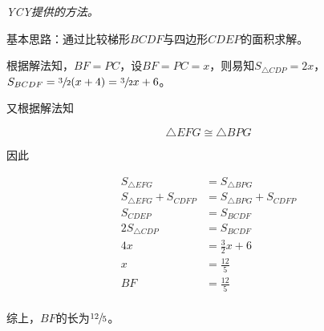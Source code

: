 \emph{YCY提供的方法。}

基本思路：通过比较梯形$BCDF$与四边形$CDEP$的面积求解。

根据解法知，$BF = PC$，设$BF = PC = x$，则易知$S_{\triangle CDP} = 2x$，$S_{BCDF} = \sfrac32(x + 4) = \sfrac32x + 6$。

又根据解法知

\[ \triangle EFG \cong \triangle BPG \]

因此

\begin{align*}
  S_{\triangle EFG} &= S_{\triangle BPG} \\
  S_{\triangle EFG} + S_{CDFP} &= S_{\triangle BPG} + S_{CDFP} \\
  S_{CDEP} &= S_{BCDF} \\
  2S_{\triangle CDP} &= S_{BCDF} \\
  4x &= \frac32x + 6 \\
  x &= \frac{12}5 \\
  BF &= \frac{12}5 \\
\end{align*}

综上，$BF$的长为$\sfrac{12}5$。

